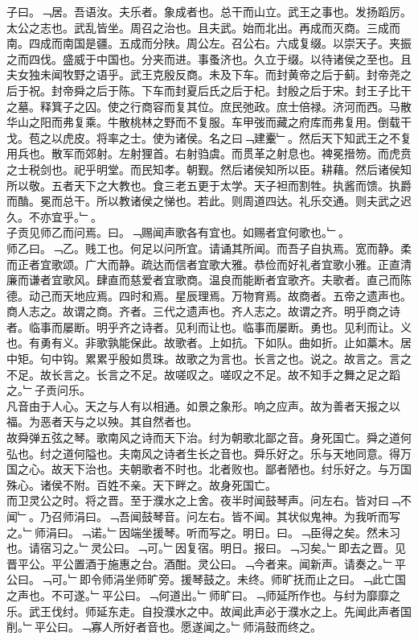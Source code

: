 \documentclass{zhvt-classic}
\begin{document}
\hspace*{2em}子曰。﹁居。吾语汝。夫乐者。象成者也。总干而山立。武王之事也。发扬蹈厉。太公之志也。武乱皆坐。周召之治也。且夫武。始而北出。再成而灭商。三成而南。四成而南国是疆。五成而分陕。周公左。召公右。六成复缀。以崇天子。夹振之而四伐。盛威于中国也。分夹而进。事蚤济也。久立于缀。以待诸侯之至也。且夫女独未闻牧野之语乎。武王克殷反商。未及下车。而封黄帝之后于蓟。封帝尧之后于祝。封帝舜之后于陈。下车而封夏后氏之后于杞。封殷之后于宋。封王子比干之墓。释箕子之囚。使之行商容而复其位。庶民弛政。庶士倍禄。济河而西。马散华山之阳而弗复乘。牛散桃林之野而不复服。车甲弢而藏之府库而弗复用。倒载干戈。苞之以虎皮。将率之士。使为诸侯。名之曰﹁建櫜﹂。然后天下知武王之不复用兵也。散军而郊射。左射狸首。右射驺虞。而贯革之射息也。裨冕搢笏。而虎贲之士税剑也。祀乎明堂。而民知孝。朝觐。然后诸侯知所以臣。耕藉。然后诸侯知所以敬。五者天下之大教也。食三老五更于太学。天子袒而割牲。执酱而馈。执爵而酳。冕而总干。所以教诸侯之悌也。若此。则周道四达。礼乐交通。则夫武之迟久。不亦宜乎。﹂。\\
\hspace*{2em}子贡见师乙而问焉。曰。﹁赐闻声歌各有宜也。如赐者宜何歌也。﹂。\\
\hspace*{2em}师乙曰。﹁乙。贱工也。何足以问所宜。请诵其所闻。而吾子自执焉。宽而静。柔而正者宜歌颂。广大而静。疏达而信者宜歌大雅。恭俭而好礼者宜歌小雅。正直清廉而谦者宜歌风。肆直而慈爱者宜歌商。温良而能断者宜歌齐。夫歌者。直己而陈德。动己而天地应焉。四时和焉。星辰理焉。万物育焉。故商者。五帝之遗声也。商人志之。故谓之商。齐者。三代之遗声也。齐人志之。故谓之齐。明乎商之诗者。临事而屡断。明乎齐之诗者。见利而让也。临事而屡断。勇也。见利而让。义也。有勇有义。非歌孰能保此。故歌者。上如抗。下如队。曲如折。止如藁木。居中矩。句中钩。累累乎殷如贯珠。故歌之为言也。长言之也。说之。故言之。言之不足。故长言之。长言之不足。故嗟叹之。嗟叹之不足。故不知手之舞之足之蹈之。﹂子贡问乐。\\
\hspace*{2em}凡音由于人心。天之与人有以相通。如景之象形。响之应声。故为善者天报之以福。为恶者天与之以殃。其自然者也。\\
\hspace*{2em}故舜弹五弦之琴。歌南风之诗而天下治。纣为朝歌北鄙之音。身死国亡。舜之道何弘也。纣之道何隘也。夫南风之诗者生长之音也。舜乐好之。乐与天地同意。得万国之心。故天下治也。夫朝歌者不时也。北者败也。鄙者陋也。纣乐好之。与万国殊心。诸侯不附。百姓不亲。天下畔之。故身死国亡。\\
\hspace*{2em}而卫灵公之时。将之晋。至于濮水之上舍。夜半时闻鼓琴声。问左右。皆对曰﹁不闻﹂。乃召师涓曰。﹁吾闻鼓琴音。问左右。皆不闻。其状似鬼神。为我听而写之。﹂师涓曰。﹁诺。﹂因端坐援琴。听而写之。明日。曰。﹁臣得之矣。然未习也。请宿习之。﹂灵公曰。﹁可。﹂因复宿。明日。报曰。﹁习矣。﹂即去之晋。见晋平公。平公置酒于施惠之台。酒酣。灵公曰。﹁今者来。闻新声。请奏之。﹂平公曰。﹁可。﹂即令师涓坐师旷旁。援琴鼓之。未终。师旷抚而止之曰。﹁此亡国之声也。不可遂。﹂平公曰。﹁何道出。﹂师旷曰。﹁师延所作也。与纣为靡靡之乐。武王伐纣。师延东走。自投濮水之中。故闻此声必于濮水之上。先闻此声者国削。﹂平公曰。﹁寡人所好者音也。愿遂闻之。﹂师涓鼓而终之。\\
\end{document}
